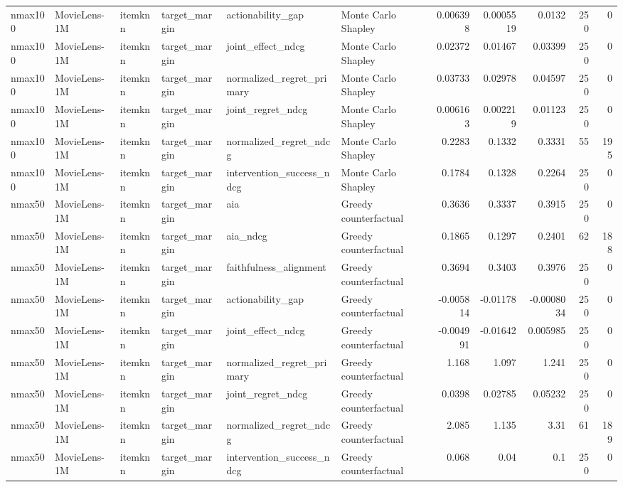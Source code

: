 \begin{table}[t]
{\begin{tabular}{llllllrrrrr}
nmax100 & MovieLens-1M & itemknn & target\_margin & actionability\_gap & Monte Carlo Shapley & 0.006398 & 0.0005519 & 0.0132 & 250 & 0 \\
nmax100 & MovieLens-1M & itemknn & target\_margin & joint\_effect\_ndcg & Monte Carlo Shapley & 0.02372 & 0.01467 & 0.03399 & 250 & 0 \\
nmax100 & MovieLens-1M & itemknn & target\_margin & normalized\_regret\_primary & Monte Carlo Shapley & 0.03733 & 0.02978 & 0.04597 & 250 & 0 \\
nmax100 & MovieLens-1M & itemknn & target\_margin & joint\_regret\_ndcg & Monte Carlo Shapley & 0.006163 & 0.002219 & 0.01123 & 250 & 0 \\
nmax100 & MovieLens-1M & itemknn & target\_margin & normalized\_regret\_ndcg & Monte Carlo Shapley & 0.2283 & 0.1332 & 0.3331 & 55 & 195 \\
nmax100 & MovieLens-1M & itemknn & target\_margin & intervention\_success\_ndcg & Monte Carlo Shapley & 0.1784 & 0.1328 & 0.2264 & 250 & 0 \\
nmax50 & MovieLens-1M & itemknn & target\_margin & aia & Greedy counterfactual & 0.3636 & 0.3337 & 0.3915 & 250 & 0 \\
nmax50 & MovieLens-1M & itemknn & target\_margin & aia\_ndcg & Greedy counterfactual & 0.1865 & 0.1297 & 0.2401 & 62 & 188 \\
nmax50 & MovieLens-1M & itemknn & target\_margin & faithfulness\_alignment & Greedy counterfactual & 0.3694 & 0.3403 & 0.3976 & 250 & 0 \\
nmax50 & MovieLens-1M & itemknn & target\_margin & actionability\_gap & Greedy counterfactual & -0.005814 & -0.01178 & -0.0008034 & 250 & 0 \\
nmax50 & MovieLens-1M & itemknn & target\_margin & joint\_effect\_ndcg & Greedy counterfactual & -0.004991 & -0.01642 & 0.005985 & 250 & 0 \\
nmax50 & MovieLens-1M & itemknn & target\_margin & normalized\_regret\_primary & Greedy counterfactual & 1.168 & 1.097 & 1.241 & 250 & 0 \\
nmax50 & MovieLens-1M & itemknn & target\_margin & joint\_regret\_ndcg & Greedy counterfactual & 0.0398 & 0.02785 & 0.05232 & 250 & 0 \\
nmax50 & MovieLens-1M & itemknn & target\_margin & normalized\_regret\_ndcg & Greedy counterfactual & 2.085 & 1.135 & 3.31 & 61 & 189 \\
nmax50 & MovieLens-1M & itemknn & target\_margin & intervention\_success\_ndcg & Greedy counterfactual & 0.068 & 0.04 & 0.1 & 250 & 0 \\

\end{tabular}}
\end{table}
